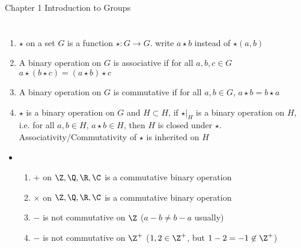 \documentclass[11pt]{article}
\begin{document}
\begin{center}
    {\Huge Chapter 1 Introduction to Groups}
\end{center}
\tableofcontents
\newpage


\section{}


\begin{definition*} 
    \begin{enumerate}
        \item {} $\star$ on a set $G$ is a function $\star:G\to G$. write $a\star b$ instead of $\star(a,b)$
        \item {} A binary operation on $G$ is associative if for all $a,b,c\in G$ $a\star (b\star c) = (a\star b) \star c$
        \item {} A binary operation on $G$ is commutative if for all $a,b\in G$, $a\star b = b\star a$
        \item {} $\star$ is a binary operation on $G$ and $H\subset H$, if $\star|_H$ is a binary operation on $H$, i.e. for all $a,b\in H$, $a\star b \in H$, then $H$ is closed under $\star$. Associativity/Commutativity of $\star$ is inherited on $H$
    \end{enumerate}
    \begin{itemize}
        \item {}
        \begin{enumerate}
            \item $+$ on $\Z,\Q,\R,\C$ is a commutative binary operation
            \item $\times$ on $\Z,\Q,\R,\C$ is a commutative binary operation
            \item $-$ is not commutative on $\Z$ ($a-b \neq b-a$ usually)
            \item $-$ is not commutative on $\Z^+$ ($1,2\in\Z^+$, but $1-2 = -1 \not\in \Z^+$)
        \end{enumerate}
    \end{itemize}
\end{definition*}
\end{document}
